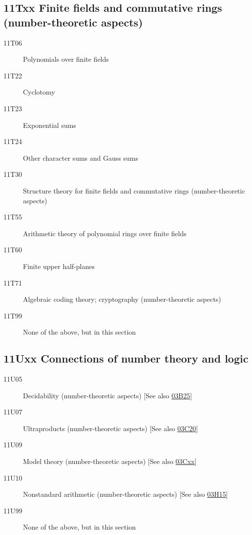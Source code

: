 \subsection*{11Txx  Finite fields and commutative rings (number-theoretic aspects) }\label{11Txx}
\begin{description}  
\item [11T06]\label{11T06} Polynomials over finite fields
\item [11T22]\label{11T22} Cyclotomy
\item [11T23]\label{11T23} Exponential sums
\item [11T24]\label{11T24} Other character sums and Gauss sums
\item [11T30]\label{11T30} Structure theory for finite fields and commutative rings (number-theoretic aspects) 
\item [11T55]\label{11T55} Arithmetic theory of polynomial rings over finite fields
\item [11T60]\label{11T60} Finite upper half-planes
\item [11T71]\label{11T71} Algebraic coding theory; cryptography (number-theoretic aspects)
\item [11T99]\label{11T99} None of the above, but in this section
\end{description}
\subsection*{11Uxx  Connections of number theory and logic }\label{11Uxx}
\begin{description}  
\item [11U05]\label{11U05} Decidability (number-theoretic aspects) [See also \hyperref[03B25]{03B25}]
\item [11U07]\label{11U07} Ultraproducts (number-theoretic aspects) [See also \hyperref[03C20]{03C20}]
\item [11U09]\label{11U09} Model theory (number-theoretic aspects) [See also \hyperref[03Cxx]{03Cxx}]
\item [11U10]\label{11U10} Nonstandard arithmetic (number-theoretic aspects) [See also \hyperref[03H15]{03H15}]
\item [11U99]\label{11U99} None of the above, but in this section
\end{description}
